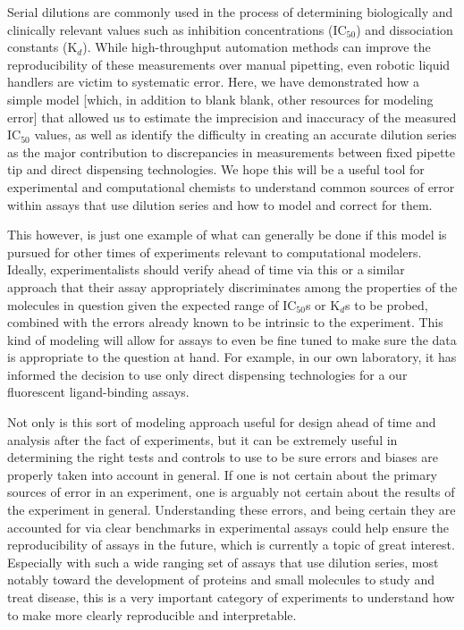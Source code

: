 \documentclass[aps,pre,twocolumn,nofootinbib,superscriptaddress,linenumbers]{revtex4-1}
\begin{document}
Serial dilutions are commonly used in the process of determining biologically and clinically relevant values such as inhibition concentrations (IC$_{ 50}$)  and dissociation constants (K$_{d}$). 
While high-throughput automation methods can improve the reproducibility of these measurements over manual pipetting, even robotic liquid handlers are victim to systematic error. 
Here, we have demonstrated how a simple model {\color{red} [which, in addition to blank blank, other resources for modeling error]} that allowed us to estimate the imprecision and inaccuracy of the measured IC$_{50}$ values, as well as identify the difficulty in creating an accurate dilution series as the major contribution to discrepancies in measurements between fixed pipette tip and direct dispensing technologies. 
We hope this will be a useful tool for experimental and computational chemists to understand common sources of error within assays that use dilution series and how to model and correct for them.

This however, is just one example of what can generally be done if this model is pursued for other times of experiments relevant to computational modelers.
Ideally, experimentalists should verify ahead of time via this or a similar approach that their assay appropriately discriminates among the properties of the molecules in question given the expected range of IC$_{ 50}$s or K$_{d}$s to be probed, combined with the errors already known to be intrinsic to the experiment. 
This kind of modeling will allow for assays to even be fine tuned to make sure the data is appropriate to the question at hand. 
For example, in our own laboratory, it has informed the decision to use only direct dispensing technologies for a our fluorescent ligand-binding assays.

Not only is this sort of modeling approach useful for design ahead of time and analysis after the fact of experiments, but it can be extremely useful in determining the right tests and controls to use to be sure errors and biases are properly taken into account in general. If one is not certain about the primary sources of error in an experiment, one is arguably not certain about the results of the experiment in general. 
Understanding these errors, and being certain they are accounted for via clear benchmarks in experimental assays could help ensure the reproducibility of assays in the future, which is currently a topic of great interest. 
Especially with such a wide ranging set of assays that use dilution series, most notably toward the development of proteins and small molecules to study and treat disease, this is a very important category of experiments to understand how to make more clearly reproducible and interpretable.
\end{document}
